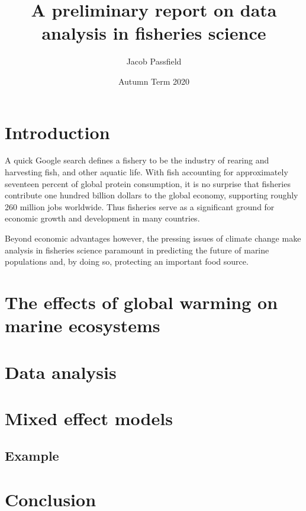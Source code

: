 \documentclass{article}
\title{\huge{\bf{A preliminary report on data analysis in fisheries science}}}
\author{Jacob Passfield}
\date{Autumn Term 2020}
\begin{document}
\maketitle

\section{Introduction}

A quick Google search defines a fishery to be the industry of rearing and harvesting fish, and other aquatic life. With fish accounting for approximately seventeen percent of global protein consumption, it is no surprise that fisheries contribute one hundred billion dollars to the global economy, supporting roughly 260 million jobs worldwide. Thus fisheries serve as a significant ground for economic growth and development in many countries. 

Beyond economic advantages however, the pressing issues of climate change make analysis in fisheries science paramount in predicting the future of marine populations and, by doing so, protecting an important food source.

\section{The effects of global warming on marine ecosystems}

\section{Data analysis}

\section{Mixed effect models}

\subsection{Example}

\section{Conclusion}



\end{document}
